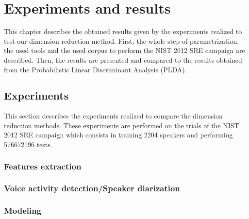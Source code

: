 \documentclass{techrep}
\begin{document}
\chapter{Experiments and results}

This chapter describes the obtained results given by the experiments
realized to test our dimension reduction method. First, the whole step
of parametrization, the used tools and the used corpus to perform
the NIST 2012 SRE campaign are described. Then, the results are
presented and compared to the results obtained from the Probabilistic
Linear Discriminant Analysis (PLDA).

\section{Experiments}


This section describes the experiments realized to compare the
dimension reduction methods. These experiments are performed on the
trials of the NIST 2012 SRE campaign which consists in training 2204
speakers and performing 576672196 tests. %

\subsection{Features extraction}


\subsection{Voice activity detection/Speaker diarization}
\subsection{Modeling}
\end{document}

